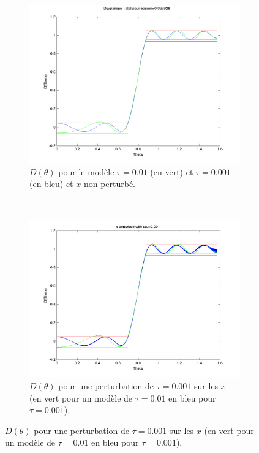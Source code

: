 \begin{figure}[h!]
  \centering
  \begin{subfigure}[b]{0.32\textwidth}
  \includegraphics[width=\textwidth]{D-ModRobust1.png}
  \caption{$D(\theta)$ pour le modèle $\tau = 0.01$ (en vert) et $\tau = 0.001$ (en bleu) et $x$ non-perturbé.}
  \label{fig:D-ModRobust1}
  \end{subfigure}
  ~ 
 \begin{subfigure}[b]{0.32\textwidth}
  \includegraphics[width=\textwidth]{D-ModRobust1-test3Rob001.png}
  \caption{$D(\theta)$ pour une perturbation de $\tau = 0.001$ sur les $x$ (en vert pour un modèle de $\tau=0.01$ en bleu pour $\tau=0.001$).}
  \label{fig:D-ModRobust1-test3RobTau001}

\end{subfigure}
\end{figure}
